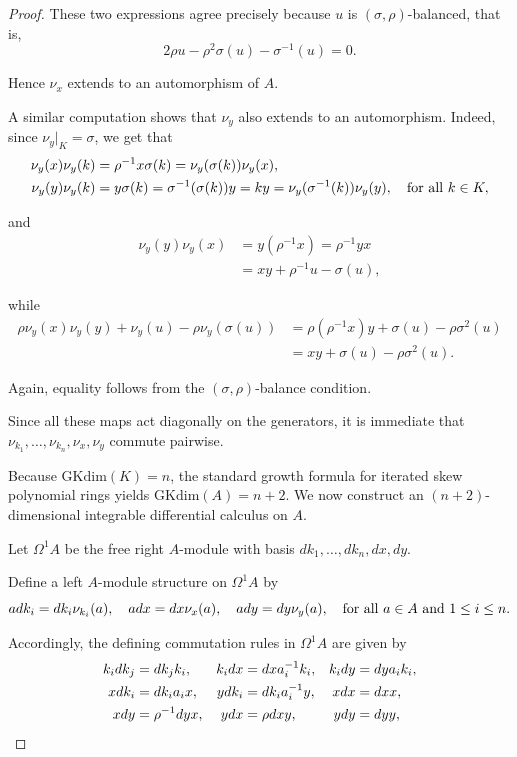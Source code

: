 \documentclass{amsart}
\theoremstyle{definition}
\theoremstyle{remark}
\numberwithin{equation}{section}
\begin{document}
\begin{proof}
These two expressions agree precisely because $u$ is $(\sigma,\rho)$-balanced, that is,
\[
2\rho u-\rho^2\sigma(u)-\sigma^{-1}(u)=0.
\]

Hence $\nu_x$ extends to an automorphism of $A$.

A similar computation shows that $\nu_y$ also extends to an automorphism. Indeed, since $\nu_y|_K=\sigma$, we get that 
\begin{align*}
\nu_y(x)\nu_y(k) &= \rho^{-1}x\sigma(k) = \nu_y(\sigma(k))\nu_y(x), \\
\nu_y(y)\nu_y(k) &= y\sigma(k) = \sigma^{-1}(\sigma(k))y = k y = \nu_y(\sigma^{-1}(k))\nu_y(y), \quad {\rm for\ all} \ k\in K, 
\end{align*}

and
\begin{align*}
\nu_y(y)\nu_y(x) &= y(\rho^{-1}x) = \rho^{-1}yx \\
   &= xy+\rho^{-1}u-\sigma(u),
\end{align*}

while
\begin{align*}
\rho\nu_y(x)\nu_y(y)+\nu_y(u)-\rho\nu_y(\sigma(u)) &= \rho(\rho^{-1}x)y+\sigma(u)-\rho\sigma^2(u) \\
&= xy+\sigma(u)-\rho\sigma^2(u).
\end{align*}

Again, equality follows from the $(\sigma,\rho)$-balance condition.

Since all these maps act diagonally on the generators, it is immediate that $\nu_{k_1}, \ldots, \nu_{k_n}, \nu_x, \nu_y$ commute pairwise.

Because $\mathrm{GKdim}(K)=n$, the standard growth formula for iterated skew polynomial rings yields $\mathrm{GKdim}(A) = n+2$. We now construct an $(n+2)$-dimensional integrable differential calculus on $A$.

Let $\Omega^1A$ be the free right $A$-module with basis $dk_1,\ldots,dk_n,dx,dy$.

Define a left $A$-module structure on $\Omega^1A$ by
\begin{equation}\label{relrightmodm322}
adk_i=dk_i \nu_{k_i}(a),\quad adx=dx \nu_x(a),\quad ady=dy \nu_y(a), \quad {\rm for\ all} \ a\in A \ {\rm and} \ 1 \leq i\leq n.
\end{equation}

Accordingly, the defining commutation rules in $\Omega^1A$ are given by 
\begin{align}
k_i dk_j &= dk_j k_i, & k_i dx &= dx a_i^{-1}k_i, & k_i dy &= dy a_i k_i, \label{reltx4} \\
x dk_i &= dk_i a_i x, & y dk_i &= dk_i a_i^{-1}y, & x dx &= dx x, \notag \\
x dy &= \rho^{-1}dy x, & y dx &= \rho dx y, & y dy &= dy y, \label{reltx4.}
\end{align}


\end{proof}
\end{document}
